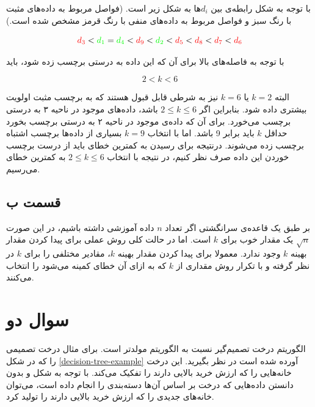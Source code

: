 \documentclass{article}
\begin{document}
با توجه به شکل رابطه‌‌ی بین $d_i$ها به شکل زیر است. (فواصل مربوط به داده‌های مثبت با رنگ سبز
و فواصل مربوط به داده‌های منفی با رنگ قرمز مشخص شده است.)

$$\textcolor{red}{d_3} < \textcolor{green}{d_1} = \textcolor{green}{d_4} < \textcolor{red}{d_9} <
\textcolor{green}{d_2} < \textcolor{red}{d_5} < \textcolor{red}{d_8} < \textcolor{red}{d_7} < \textcolor{red}{d_6} $$

با توجه به فاصله‌های بالا برای آن‌ که این داده به درستی برچسب زده شود، باید

$$2 < k < 6$$

البته $k=2$ یا $k=6$ نیز به شرطی قابل قبول هستند که به برچسب مثبت اولویت بیشتری داده شود.
بنابراین اگر $2 \leq k \leq 6$ باشد، داده‌های موجود در ناحیه ۳ به درستی برچسب می‌خورد. برای آن که
داده‌ی موجود در ناحیه ۲ به درستی برچسب بخورد حداقل $k$ باید برابر 9 باشد. اما با انتخاب $k=9$
بسیاری از داده‌ها برچسب اشتباه برچسب زده می‌شوند. درنتیجه برای رسیدن به کمترین خطای 
باید از درست‌ برچسب خوردن این داده صرف نظر کنیم، در نتیجه با انتخاب $2 \leq k \leq 6$ به کمترین
خطای  می‌رسیم.

\subsection*{قسمت ب}

بر طبق یک قاعده‌ی سرانگشتی اگر تعداد $n$ داده آموزشی داشته باشیم، در این صورت
$\sqrt{n}$ یک مقدار خوب برای $k$ است. اما در حالت کلی روش عملی برای پیدا کردن مقدار بهینه $k$ وجود ندارد.
معمولا برای پیدا کردن مقدار بهینه $k$، مقادیر مختلفی را برای $k$ در نظر گرفته و با تکرار روش 
مقداری از $k$ که به ازای آن خطای کمینه می‌شود را انتخاب می‌کنند.

\section*{سوال دو}

الگوریتم درخت تصمیم‌گیر نسبت به الگوریتم  مولدتر است. برای مثال درخت تصمیمی
را که در شکل \ref{decision-tree-example} آورده شده است در نظر بگیرید. این درخت خانه‌هایی را که ارزش خرید
بالایی دارند را تفکیک می‌کند. با توجه به شکل و بدون دانستن داده‌هایی که درخت بر اساس آن‌ها دسته‌بندی را انجام داده
است، می‌توان خانه‌های جدیدی را که ارزش خرید بالایی دارند را تولید کرد.
\end{document}
